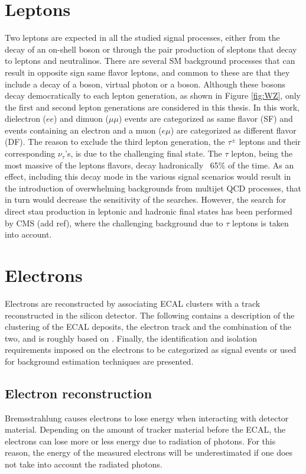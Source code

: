 \section{Leptons}
Two leptons are expected in all the studied signal processes, either from the decay of an on-shell \PZ boson or through the pair production of sleptons that decay to leptons and neutralinos. 
There are several SM background processes that can result in opposite sign same flavor leptons, and common to these are that they include a decay of a \PZ boson, virtual photon or a \PW boson. 
Although these bosons decay democratically to each lepton generation, as shown in Figure \ref{fig:WZ}, only the first and second lepton generations are considered in this thesis. 
In this work, dielectron ($ee$) and dimuon ($\mu\mu$) events are categorized as same flavor (SF) and events containing an electron and a muon ($e\mu$) are categorized as different flavor (DF). 
The reason to exclude the third lepton generation, the $\tau^{\pm}$ leptons and their corresponding $\nu_{\tau}$'s, is due to the challenging final state. 
The $\tau$ lepton, being the most massive of the leptons flavors, decay hadronically ~65\% of the time. 
As an effect, including this decay mode in the various signal scenarios would result in the introduction of overwhelming backgrounds from multijet QCD processes, that in turn would decrease the sensitivity of the searches. 
However, the search for direct stau production in leptonic and hadronic final states has been performed by CMS (add ref), where the challenging background due to $\tau$ leptons is taken into account.  
\section{Electrons}
\label{subsub:electrons}
Electrons are reconstructed by associating ECAL clusters with a track reconstructed in the silicon detector. 
The following contains a description of the clustering of the ECAL deposits, the electron track and the combination of the two, and is roughly based on \cite{Khachatryan:2015hwa}. 
Finally, the identification and isolation requirements imposed on the electrons to be categorized as signal events or used for background estimation techniques are presented. 
\subsection{Electron reconstruction}
Bremsstrahlung causes electrons to lose energy when interacting with detector material. 
Depending on the amount of tracker material before the ECAL, the electrons can lose more or less energy due to radiation of photons. 
For this reason, the energy of the measured electrons will be underestimated if one does not take into account the radiated photons. 
